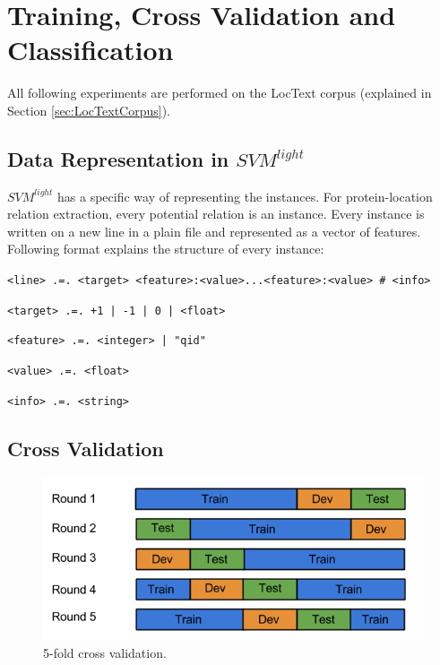 \section{Training, Cross Validation and Classification}\label{sec:training}

All following experiments are performed on the LocText \cite{loctext} corpus (explained in Section \ref{sec:LocTextCorpus}).

\subsection{Data Representation in $SVM^{light}$ }

$SVM^{light}$ \cite{joachims1999making} has a specific way of representing the instances. For protein-location relation extraction, every potential relation is an instance. Every instance is written on a new line in a plain file and represented as a vector of features. Following format explains the structure of every instance:

\bigskip

\texttt{<line> .=. <target> <feature>:<value>...<feature>:<value> \# <info>}

\texttt{<target> .=. +1 | -1 | 0 | <float>}

\texttt{<feature> .=. <integer> | "qid"}

\texttt{<value> .=. <float>}

\texttt{<info> .=. <string>}

\subsection{Cross Validation}

\begin{figure}
\centering
\includegraphics[scale=0.6]{figures/CrossValidation.png}
\caption{5-fold cross validation.}\label{fig:crossVal}
\end{figure}

